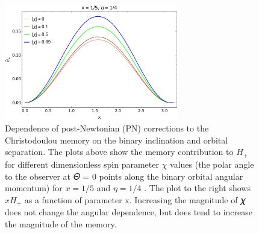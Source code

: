 \documentclass[prd,preprintnumbers,twocolumn,eqsecnum,floatfix,letter]{revtex4}
\begin{document}
\begin{widetext}
\begin{figure}
	\includegraphics[width=3.0in]{../plots/PNmemoryContributionfunofTheta.pdf}
	\caption{Dependence of post-Newtonian (PN) corrections to the Christodoulou memory on the binary inclination and orbital separation. The plots above show the memory contribution to $H_+$ for different dimensionless spin parameter $\chi$ values (the polar angle to the observer at 𝛩 = 0 points along the binary orbital angular momentum) for $x = 1/5$ and $\eta=1/4 $ . The plot to the right shows $x H_+$ as a function of parameter x. Increasing the magnitude of 𝜒 does not change the angular dependence, but does tend to increase the magnitude of the memory. 
		}
	\label{fig:0p95}
\end{figure}
\end{widetext}
\end{document}
